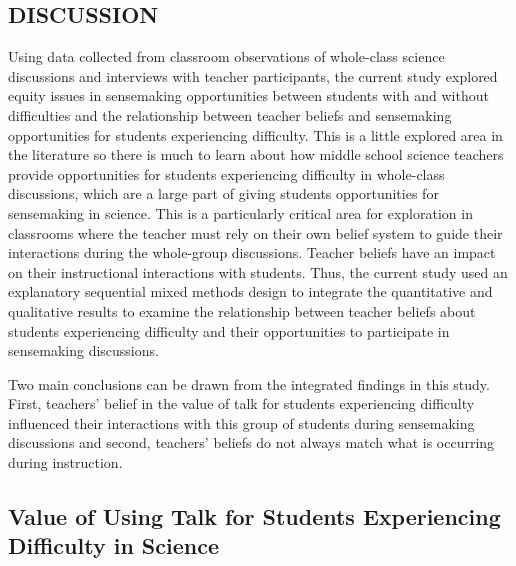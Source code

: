\documentclass{sig-alternate} %
\begin{document}
\begin{large}
\section*{DISCUSSION}

Using data collected from classroom observations of whole-class science discussions and interviews with teacher participants, the current study explored equity issues in sensemaking opportunities between students with and without difficulties and the relationship between teacher beliefs and sensemaking opportunities for students experiencing difficulty. This is a little explored area in the literature so there is much to learn about how middle school science teachers provide opportunities for students experiencing difficulty in whole-class discussions, which are a large part of giving students opportunities for sensemaking in science. This is a particularly critical area for exploration in classrooms where the teacher must rely on their own belief system to guide their interactions during the whole-group discussions. Teacher beliefs have an impact on their instructional interactions with students. Thus, the current study used an explanatory sequential mixed methods design to integrate the quantitative and qualitative results to examine the relationship between teacher beliefs about students experiencing difficulty and their opportunities to participate in sensemaking discussions. 

Two main conclusions can be drawn from the integrated findings in this study. First, teachers’ belief in the value of talk for students experiencing difficulty influenced their interactions with this group of students during sensemaking discussions and second, teachers’ beliefs do not always match what is occurring during instruction.

\subsection*{Value of Using Talk for Students Experiencing Difficulty in Science}


\end{large}
\end{document}
